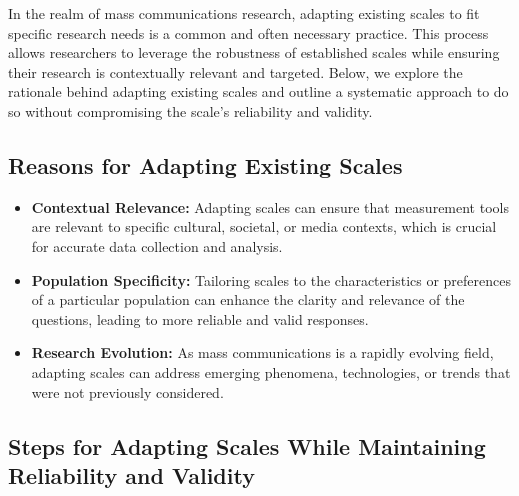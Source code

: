 \documentclass[
]{book}
\begin{document}
In the realm of mass communications research, adapting existing scales to fit specific research needs is a common and often necessary practice. This process allows researchers to leverage the robustness of established scales while ensuring their research is contextually relevant and targeted. Below, we explore the rationale behind adapting existing scales and outline a systematic approach to do so without compromising the scale's reliability and validity.

\hypertarget{reasons-for-adapting-existing-scales}{%
\subsection*{Reasons for Adapting Existing Scales}\label{reasons-for-adapting-existing-scales}}

\begin{itemize}
\item
  \textbf{Contextual Relevance:} Adapting scales can ensure that measurement tools are relevant to specific cultural, societal, or media contexts, which is crucial for accurate data collection and analysis.
\item
  \textbf{Population Specificity:} Tailoring scales to the characteristics or preferences of a particular population can enhance the clarity and relevance of the questions, leading to more reliable and valid responses.
\item
  \textbf{Research Evolution:} As mass communications is a rapidly evolving field, adapting scales can address emerging phenomena, technologies, or trends that were not previously considered.
\end{itemize}

\hypertarget{steps-for-adapting-scales-while-maintaining-reliability-and-validity}{%
\subsection*{Steps for Adapting Scales While Maintaining Reliability and Validity}\label{steps-for-adapting-scales-while-maintaining-reliability-and-validity}}
\end{document}
